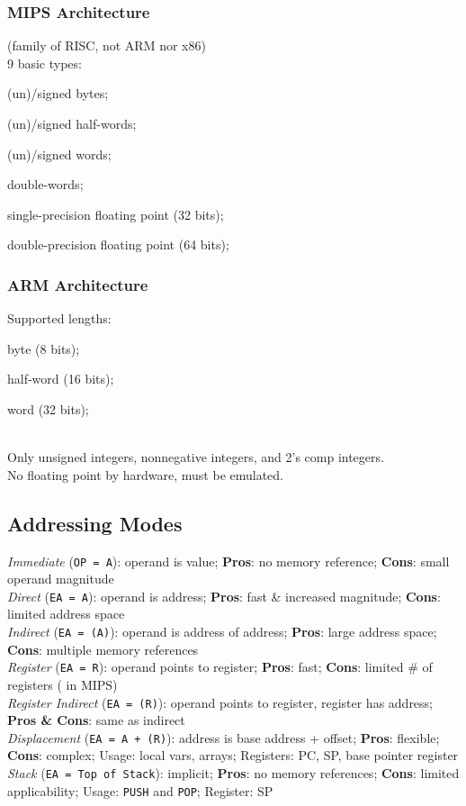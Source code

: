 \subsubsection*{MIPS Architecture}
(family of RISC, not ARM nor x86)\\
9 basic types: \begin{enuminline}
    \item (un)/signed bytes;
    \item (un)/signed half-words;
    \item (un)/signed words;
    \item double-words;
    \item single-precision floating point (32 bits);
    \item double-precision floating point (64 bits);
\end{enuminline}

\subsubsection*{ARM Architecture}
Supported lengths: \begin{enuminline}
    \item byte (8 bits);
    \item half-word (16 bits);
    \item word (32 bits);
\end{enuminline}\\
Only unsigned integers, nonnegative integers, and 2's comp integers.\\
No floating point by hardware, must be emulated.

\subsection*{Addressing Modes}
\emph{Immediate} (\texttt{OP = A}): operand is value; \textbf{Pros}: no memory reference; \textbf{Cons}: small operand magnitude\\
\emph{Direct} (\texttt{EA = A}): operand is address; \textbf{Pros}: fast \& increased magnitude; \textbf{Cons}: limited address space\\
\emph{Indirect} (\texttt{EA = (A)}): operand is address of address; \textbf{Pros}: large address space; \textbf{Cons}: multiple memory references\\
\emph{Register} (\texttt{EA = R}): operand points to register; \textbf{Pros}: fast; \textbf{Cons}: limited \# of registers ( in MIPS)\\
\emph{Register Indirect} (\texttt{EA = (R)}): operand points to register, register has address; \textbf{Pros \& Cons}: same as indirect\\
\emph{Displacement} (\texttt{EA = A + (R)}): address is base address + offset; \textbf{Pros}: flexible; \textbf{Cons}: complex; Usage: local vars, arrays; Registers: PC, SP, base pointer register\\
\emph{Stack} (\texttt{EA = Top of Stack}): implicit; \textbf{Pros}: no memory references; \textbf{Cons}: limited applicability; Usage: \texttt{PUSH} and \texttt{POP}; Register: SP

